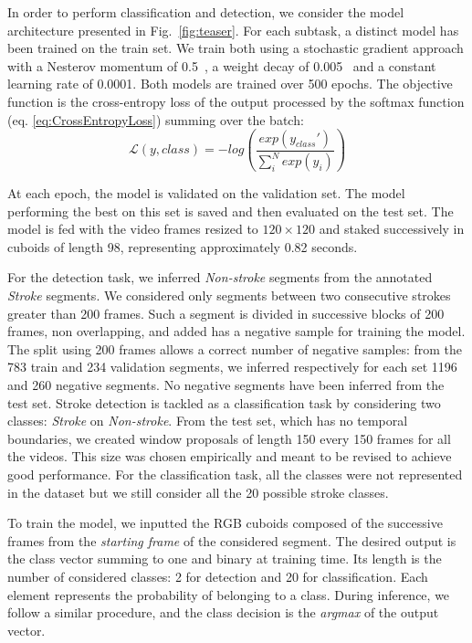 \documentclass[sigconf]{acmart-me}
\begin{document}
In order to perform classification and detection, we consider the model architecture presented in Fig.~\ref{fig:teaser}. For each subtask, a distinct model has been trained on the train set. We train both using a stochastic gradient approach with a Nesterov momentum of 0.5~\cite{Deep:Nesterov1}, a weight decay of 0.005~\citep{Deep:weight_decay} and a constant learning rate of 0.0001. Both models are trained over 500 epochs. The objective function is the cross-entropy loss of the output processed by the softmax function (eq. \ref{eq:CrossEntropyLoss}) summing over the batch:
\vspace{-2pt}
\begin{equation}
    \label{eq:CrossEntropyLoss}
    \mathcal{L}(y,class) = -log(\dfrac{exp(y_{class}')}{\sum_i^Nexp(y_i)})
\end{equation}

At each epoch, the model is validated on the validation set. The model performing the best on this set is saved and then evaluated on the test set. The model is fed with the video frames resized to $120\times120$ and staked successively in cuboids of length 98, representing approximately 0.82 seconds.
\par
For the detection task, we inferred \textit{Non-stroke} segments from the annotated \textit{Stroke} segments. We considered only segments between two consecutive strokes greater than 200 frames. Such a segment is divided in successive blocks of 200 frames, non overlapping, and added has a negative sample for training the model. The split using 200 frames allows a correct number of negative samples: from the 783 train and 234 validation segments, we inferred respectively for each set 1196 and 260 negative segments. No negative segments have been inferred from the test set. Stroke detection is tackled as a classification task by considering two classes: \textit{Stroke} on \textit{Non-stroke}. From the test set, which has no temporal boundaries, we created window proposals of length 150 every 150 frames for all the videos. This size was chosen empirically and meant to be revised to achieve good performance. For the classification task, all the classes were not represented in the dataset but we still consider all the 20 possible stroke classes.
\par
To train the model, we inputted the RGB cuboids composed of the successive frames from the \textit{starting frame} of the considered segment. The desired output is the class vector summing to one and binary at training time. Its length is the number of considered classes: 2 for detection and 20 for classification. Each element represents the probability of belonging to a class. During inference, we follow a similar procedure, and the class decision is the \textit{argmax} of the output vector.
\vspace{-7pt}
\end{document}
